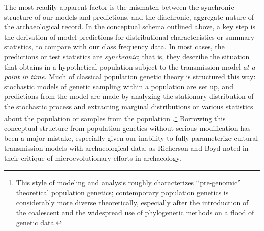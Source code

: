 The most readily apparent factor is the mismatch between the synchronic structure of our models and predictions, and the diachronic, aggregate nature of the archaeological record.  In the conceptual schema outlined above, a key step is the derivation of model predictions for distributional characteristics or summary statistics, to compare with our class frequency data.  In most cases, the predictions or test statistics are \emph{synchronic}; that is, they describe the situation that obtains in a hypothetical population subject to the transmission model \emph{at a point in time}.  Much of classical population genetic theory is structured this way:  stochastic models of genetic sampling within a population are set up, and predictions from the model are made by analyzing the stationary distribution of the stochastic process and extracting marginal distributions or various statistics about the population or samples from the population .\footnote{This style of modeling and analysis roughly characterizes ``pre-genomic'' theoretical population genetics; contemporary population genetics is considerably more diverse theoretically, especially after the introduction of the coalescent \citep{Wakeley2008} and the widespread use of phylogenetic methods on a flood of genetic data.}  Borrowing this conceptual structure from population genetics without serious modification has been a major mistake, especially given our inability to fully parameterize cultural transmission models with archaeological data, as Richerson and Boyd \citeyearpar[301-302]{Boyd2008} noted in their critique of microevolutionary efforts in archaeology.  

